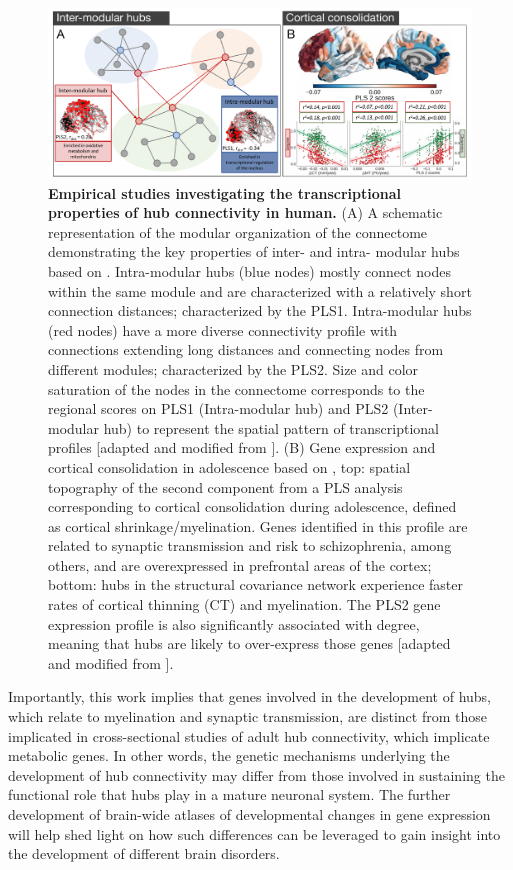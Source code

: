 \begin{figure}[H]
\begin{center}
\includegraphics[width=1\textwidth]{Chapter3/Ch3Fig4.pdf}%
\end{center}
\caption{\textbf{Empirical studies investigating the transcriptional properties of hub connectivity in human.} 
(A) A schematic representation of the modular organization of the connectome demonstrating the key properties of inter- and intra- modular hubs based on \citet{Vertes2016b}. 
Intra-modular hubs (blue nodes) mostly connect nodes within the same module and are characterized with a relatively short connection distances; characterized by the PLS1. Intra-modular hubs (red nodes) have a more diverse connectivity profile with connections extending long distances and connecting nodes from different modules; characterized by the PLS2. Size and color saturation of the nodes in the connectome corresponds to the regional scores on PLS1 (Intra-modular hub) and PLS2 (Inter-modular hub) to represent the spatial pattern of transcriptional profiles [adapted and modified from \citet{Vertes2016b}]. 
(B) Gene expression and cortical consolidation in adolescence based on \citet{Whitaker2016a}, 
top: spatial topography of the second component from a PLS analysis corresponding to cortical consolidation during adolescence, defined as cortical shrinkage/myelination. Genes identified in this profile are related to synaptic transmission and risk to schizophrenia, among others, and are overexpressed in prefrontal areas of the cortex; bottom: hubs in the structural covariance network experience faster rates of cortical thinning (CT) and myelination. The PLS2 gene expression profile is also significantly associated with degree, meaning that hubs are likely to over-express those genes [adapted and modified from \citet{Whitaker2016a}]. } \label{fig:Ch3Fig4}
\end{figure}

Importantly, this work implies that genes involved in the development of hubs, which relate to myelination and synaptic transmission, are distinct from those implicated in cross-sectional studies of adult hub connectivity, which implicate metabolic genes. In other words, the genetic mechanisms underlying the development of hub connectivity may differ from those involved in sustaining the functional role that hubs play in a mature neuronal system. The further development of brain-wide atlases of developmental changes in gene expression will help shed light on how such differences can be leveraged to gain insight into the development of different brain disorders.

